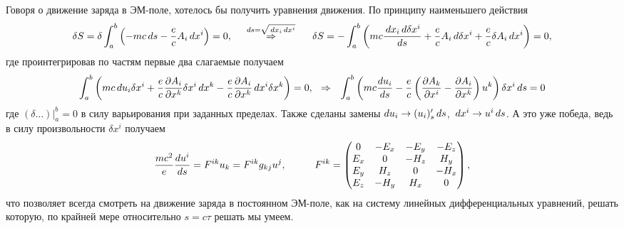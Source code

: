 Говоря о движение заряда в ЭМ-поле, хотелось бы получить уравнения движения. По принципу наименьшего действия
\begin{equation*}
    \delta S = \delta \int_a^b \left(
        -mc \, d s - \frac{e}{c} A_i \, d x^i
    \right) = 0,
    \hspace{0.5cm} \overset{ds = \sqrt{\, d x_i \, d x^i}}{\Rightarrow}  \hspace{0.5cm}
    \delta S = - \int_a^b \left(
        mc \frac{\, d x_i \, d \delta x^i}{d s} + \frac{e}{c} A_i \, d \delta x^i + \frac{e}{c} \delta A_i \, d x^i
    \right) = 0,
\end{equation*}
где проинтегрировав по частям первые два слагаемые получаем
\begin{equation*}
    \int_a^b
    \left(
        m c \, d u_i \delta x^i + \frac{e}{c} \frac{\partial A_i}{\partial x^k} \delta x^i \, d x^k - \frac{e}{c} \frac{\partial A_i}{\partial x^k} \, d x^i \delta x^k
    \right) = 0,
    \hspace{0.25cm} \Rightarrow \hspace{0.25cm}
    \int_a^b \left(
        mc \frac{d u_i}{d s} - \frac{e}{c} \left(
            \frac{\partial A_k}{\partial x^i} - \frac{\partial A_i}{\partial x^k} 
        \right) u^k
    \right) \delta x^i \, d s = 0
\end{equation*}
где $(\delta \ldots) |_a^b = 0$ в силу варьирования при заданных пределах. Также сделаны замены $d u_i \to (u_i)'_s \, d s$, $\, d x^i \to u^i \, d s$. А это уже победа, ведь в силу произвольности $\delta x^i$ получаем
\begin{equation}
     \frac{m c^2}{e} \frac{d u^i}{d s} = F^{ik} u_k = F^{ik} g_{kj} u^j,
     \hspace{10 mm}
     F^{ik} = \begin{pmatrix}
         0 & -E_x & -E_y  & -E_z \\
         E_x & 0 & -H_z  & H_y \\
         E_y & H_z & 0 & -H_x \\
         E_z & -H_y & H_x & 0 \\
     \end{pmatrix},
\label{EMtensor}
\end{equation}
что позволяет всегда смотреть на движение заряда в постоянном ЭМ-поле, как на систему линейных дифференциальных уравнений, решать которую, по крайней мере относительно $s = c \tau$ решать мы умеем.